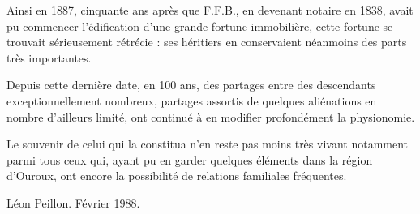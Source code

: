 \documentclass[11pt,a4paper]{report}
\begin{document}
Ainsi en 1887, cinquante ans après que F.F.B., en devenant notaire en 1838, avait pu commencer l'édification d'une grande fortune immobilière, cette fortune se trouvait sérieusement rétrécie : ses héritiers en conservaient néanmoins des parts très importantes.


Depuis cette dernière date, en 100 ans, des partages entre des descendants exceptionnellement nombreux, partages assortis de quelques aliénations en nombre d'ailleurs limité, ont continué à en modifier profondément la physionomie.

Le souvenir de celui qui la constitua n'en reste pas moins très vivant notamment parmi tous ceux qui, ayant pu en garder quelques éléments dans la région d'Ouroux, ont encore la possibilité de relations familiales fréquentes.

Léon Peillon.
Février 1988.
\end{document}
